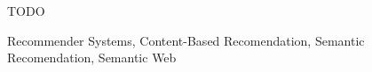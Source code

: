 TODO

\begin{keywords}
	Recommender Systems, Content-Based Recomendation, Semantic Recomendation, Semantic Web
\end{keywords}